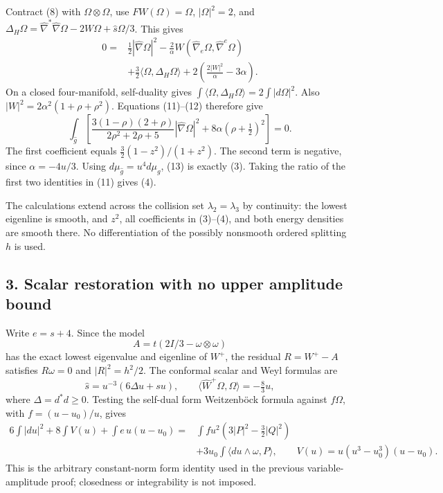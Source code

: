\documentclass[
  11pt,
]{article}
\begin{document}
Contract (8) with \(\Omega\otimes\Omega\), use \(FW(\Omega)=\Omega\),
\(|\Omega|^2=2\), and
\(\Delta_H\Omega=\widehat\nabla^*\widehat\nabla\Omega -2W\Omega+\widehat s\Omega/3\).
This gives \[
\begin{split}
0={}&\tfrac12|\widehat\nabla\Omega|^2
-\tfrac2\alpha W(\widehat\nabla_e\Omega,
                         \widehat\nabla^e\Omega)\\
&+\tfrac32\langle\Omega,\Delta_H\Omega\rangle
+2\left(\frac{2|W|^2}{\alpha}-3\alpha\right).
\end{split}                                                   \tag{12}
\] On a closed four-manifold, self-duality gives
\(\int\langle\Omega,\Delta_H\Omega\rangle=2\int|d\Omega|^2\). Also
\(|W|^2=2\alpha^2(1+\rho+\rho^2)\). Equations (11)--(12) therefore give
\[
 \int_{\widehat g}\left[
 \frac{3(1-\rho)(2+\rho)}{2\rho^2+2\rho+5}
           |\widehat\nabla\Omega|^2
       +8\alpha(\rho+\tfrac12)^2\right]=0.                 \tag{13}
\] The first coefficient equals \(\tfrac32(1-z^2)/(1+z^2)\). The second
term is negative, since \(\alpha=-4u/3\). Using
\(d\mu_{\widehat g}=u^4d\mu_g\), (13) is exactly (3). Taking the ratio
of the first two identities in (11) gives (4).

The calculations extend across the collision set \(\lambda_2=\lambda_3\)
by continuity: the lowest eigenline is smooth, and \(z^2\), all
coefficients in (3)--(4), and both energy densities are smooth there. No
differentiation of the possibly nonsmooth ordered splitting \(h\) is
used.

\hypertarget{scalar-restoration-with-no-upper-amplitude-bound}{%
\subsection{3. Scalar restoration with no upper amplitude
bound}\label{scalar-restoration-with-no-upper-amplitude-bound}}

Write \(e=s+4\). Since the model \[
 A=t(2I/3-\omega\otimes\omega)
\] has the exact lowest eigenvalue and eigenline of \(W^+\), the
residual \(R=W^+-A\) satisfies \(R\omega=0\) and \(|R|^2=h^2/2\). The
conformal scalar and Weyl formulas are \[
 \widehat s=u^{-3}(6\Delta u+su),\qquad
 \langle\widehat W^+\Omega,\Omega\rangle=-\tfrac83u,
\] where \(\Delta=d^*d\ge0\). Testing the self-dual form Weitzenböck
formula against \(f\Omega\), with \(f=(u-u_0)/u\), gives \[
\begin{split}
6\int|du|^2+8\int V(u)+\int e\,u(u-u_0)
={}&\int f u^2(3|P|^2-\tfrac32|Q|^2)\\
&+3u_0\int\langle du\wedge\omega,P\rangle,\qquad
 V(u)=u(u^3-u_0^3)(u-u_0).
\end{split}                                                   \tag{14}
\] This is the arbitrary constant-norm form identity used in the
previous variable-amplitude proof; closedness or integrability is not
imposed.
\end{document}
